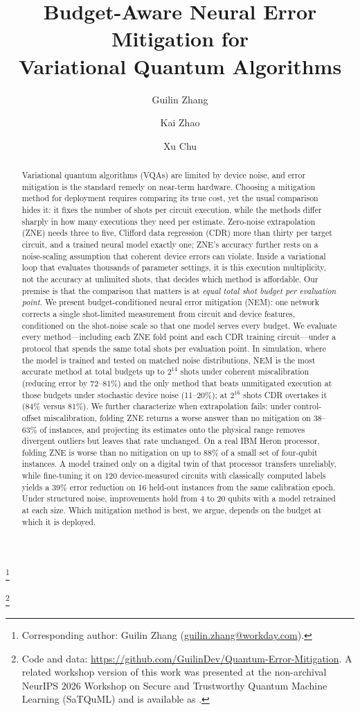 \documentclass[11pt]{article}
\title{Budget-Aware Neural Error Mitigation for\\ Variational Quantum Algorithms}
\author[1]{Guilin Zhang}
\author[1]{Kai Zhao}
\author[1]{Xu Chu}
\affil[1]{Workday AI Research}
\date{}
\newcommand\blfootnote[1]{%
  \begingroup
  \renewcommand\thefootnote{}\footnote{#1}%
  \addtocounter{footnote}{-1}%
  \endgroup
}
\begin{document}
\maketitle
\blfootnote{Corresponding author: Guilin Zhang (\href{mailto:guilin.zhang@workday.com}{guilin.zhang@workday.com}).}
\blfootnote{Code and data: \url{https://github.com/GuilinDev/Quantum-Error-Mitigation}. A related workshop version of this work was presented at the non-archival NeurIPS 2026 Workshop on Secure and Trustworthy Quantum Machine Learning (SaTQuML) and is available as \citet{zhang2026worse}.}

\begin{abstract}
Variational quantum algorithms (VQAs) are limited by device noise, and error mitigation is the standard remedy on near-term hardware. Choosing a mitigation method for deployment requires comparing its true cost, yet the usual comparison hides it: it fixes the number of shots per circuit execution, while the methods differ sharply in how many executions they need per estimate. Zero-noise extrapolation (ZNE) needs three to five, Clifford data regression (CDR) more than thirty per target circuit, and a trained neural model exactly one; ZNE's accuracy further rests on a noise-scaling assumption that coherent device errors can violate. Inside a variational loop that evaluates thousands of parameter settings, it is this execution multiplicity, not the accuracy at unlimited shots, that decides which method is affordable. Our premise is that the comparison that matters is at \emph{equal total shot budget per evaluation point}. We present budget-conditioned neural error mitigation (NEM): one network corrects a single shot-limited measurement from circuit and device features, conditioned on the shot-noise scale so that one model serves every budget. We evaluate every method---including each ZNE fold point and each CDR training circuit---under a protocol that spends the same total shots per evaluation point. In simulation, where the model is trained and tested on matched noise distributions, NEM is the most accurate method at total budgets up to $2^{14}$ shots under coherent miscalibration (reducing error by 72--81\%) and the only method that beats unmitigated execution at those budgets under stochastic device noise (11--20\%); at $2^{16}$ shots CDR overtakes it (84\% versus 81\%). We further characterize when extrapolation fails: under control-offset miscalibration, folding ZNE returns a worse answer than no mitigation on 38--63\% of instances, and projecting its estimates onto the physical range removes divergent outliers but leaves that rate unchanged. On a real IBM Heron processor, folding ZNE is worse than no mitigation on up to 88\% of a small set of four-qubit instances. A model trained only on a digital twin of that processor transfers unreliably, while fine-tuning it on 120 device-measured circuits with classically computed labels yields a 39\% error reduction on 16 held-out instances from the same calibration epoch. Under structured noise, improvements hold from 4 to 20 qubits with a model retrained at each size. Which mitigation method is best, we argue, depends on the budget at which it is deployed.


\end{abstract}
\end{document}
